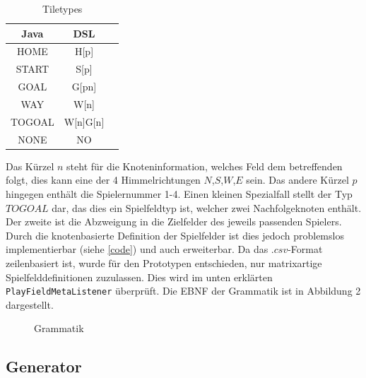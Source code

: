 \documentclass[conference]{IEEEtran}
\begin{document}
\begin{table}[h!]
  \centering
  \caption{Tiletypes}
  \label{tab:table1}
  \begin{tabular}{ccc}
    \toprule
    Java & DSL\\
    \midrule
    HOME & H[p]\\
    START & S[p]\\
    GOAL & G[pn] \\
    WAY & W[n] \\
    TOGOAL & W[n]G[n] \\
    NONE & NO \\
    \bottomrule
  \end{tabular}
\end{table}

Das K\"urzel $n$ steht f\"ur die Knoteninformation, welches Feld dem betreffenden folgt, dies kann eine der 4 Himmelrichtungen $N$,$S$,$W$,$E$ sein. Das andere K\"urzel $p$ hingegen enth\"alt die Spielernummer 1-4. Einen kleinen Spezialfall stellt der Typ $TOGOAL$ dar, das dies ein Spielfeldtyp ist, welcher zwei Nachfolgeknoten enth\"alt. Der zweite ist die Abzweigung in die Zielfelder des jeweils passenden Spielers. Durch die knotenbasierte Definition
der Spielfelder ist dies jedoch problemslos implementierbar (siehe \ref{code}) und auch erweiterbar.
Da das $.csv$-Format zeilenbasiert ist, wurde f\"ur den Prototypen entschieden, nur matrixartige Spielfelddefinitionen zuzulassen. Dies wird im unten erkl\"arten \texttt{PlayFieldMetaListener} \"uberpr\"uft.
Die EBNF der Grammatik ist in Abbildung 2 dargestellt.

\begin{figure}[]
    \centering
    \caption{Grammatik}
\end{figure}


\subsection{Generator}
\end{document}
